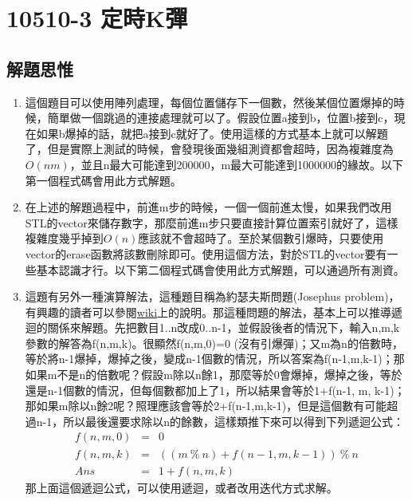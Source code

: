 \section{10510-3 定時K彈}

\subsection{解題思惟}
\begin{enumerate}
	\item 這個題目可以使用陣列處理，每個位置儲存下一個數，然後某個位置爆掉的時候，簡單做一個跳過的連接處理就可以了。假設位置a接到b，位置b接到c，現在如果b爆掉的話，就把a接到c就好了。使用這樣的方式基本上就可以解題了，但是實際上測試的時候，會發現後面幾組測資都會超時，因為複雜度為$O(nm)$，並且n最大可能達到200000，m最大可能達到1000000的緣故。以下第一個程式碼會用此方式解題。
	\item 在上述的解題過程中，前進m步的時候，一個一個前進太慢，如果我們改用STL的vector來儲存數字，那麼前進m步只要直接計算位置索引就好了，這樣複雜度幾乎掉到$O(n)$應該就不會超時了。至於某個數引爆時，只要使用vector的erase函數將該數刪除即可。使用這個方法，對於STL的vector要有一些基本認識才行。以下第二個程式碼會使用此方式解題，可以通過所有測資。
	\item 這題有另外一種演算解法，這種題目稱為約瑟夫斯問題(Josephus problem)，有興趣的讀者可以參閱\href{https://zh.wikipedia.org/wiki/%E7%BA%A6%E7%91%9F%E5%A4%AB%E6%96%AF%E9%97%AE%E9%A2%98}{wiki}上的說明。那這種問題的解法，基本上可以推導遞迴的關係來解題。先把數目1..n改成0..n-1，並假設後者的情況下，輸入n,m,k參數的解答為f(n,m,k)。很顯然f(n,m,0)=0 (沒有引爆彈)；又m為n的倍數時，等於將n-1爆掉，爆掉之後，變成n-1個數的情況，所以答案為f(n-1,m,k-1)；那如果m不是n的倍數呢？假設m除以n餘1，那麼等於0會爆掉，爆掉之後，等於還是n-1個數的情況，但每個數都加上了1，所以結果會等於1+f(n-1, m, k-1)；那如果m除以n餘2呢？照理應該會等於2+f(n-1,m,k-1)，但是這個數有可能超過n-1，所以最後還要求除以n的餘數，這樣類推下來可以得到下列遞迴公式：
		\begin{eqnarray*}
			f(n, m, 0) & = & 0 \\
			f(n, m, k) & = & ((m\ \%\ n) + f(n-1, m, k-1))\ \%\ n \\
			Ans & = & 1 + f(n, m, k)
		\end{eqnarray*}
	那上面這個遞迴公式，可以使用遞迴，或者改用迭代方式求解。
\end{enumerate}

